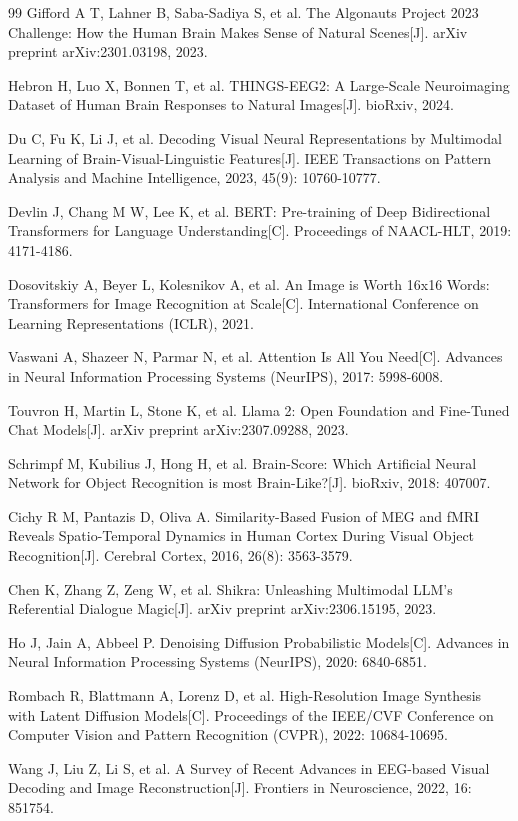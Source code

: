 \begin{thebibliography}{99}
 Gifford A T, Lahner B, Saba-Sadiya S, et al. The Algonauts Project 2023 Challenge: How the Human Brain Makes Sense of Natural Scenes[J]. arXiv preprint arXiv:2301.03198, 2023.

 Hebron H, Luo X, Bonnen T, et al. THINGS-EEG2: A Large-Scale Neuroimaging Dataset of Human Brain Responses to Natural Images[J]. bioRxiv, 2024.

 Du C, Fu K, Li J, et al. Decoding Visual Neural Representations by Multimodal Learning of Brain-Visual-Linguistic Features[J]. IEEE Transactions on Pattern Analysis and Machine Intelligence, 2023, 45(9): 10760-10777.

 Devlin J, Chang M W, Lee K, et al. BERT: Pre-training of Deep Bidirectional Transformers for Language Understanding[C]. Proceedings of NAACL-HLT, 2019: 4171-4186.

 Dosovitskiy A, Beyer L, Kolesnikov A, et al. An Image is Worth 16x16 Words: Transformers for Image Recognition at Scale[C]. International Conference on Learning Representations (ICLR), 2021.

 Vaswani A, Shazeer N, Parmar N, et al. Attention Is All You Need[C]. Advances in Neural Information Processing Systems (NeurIPS), 2017: 5998-6008.

 Touvron H, Martin L, Stone K, et al. Llama 2: Open Foundation and Fine-Tuned Chat Models[J]. arXiv preprint arXiv:2307.09288, 2023.

 Schrimpf M, Kubilius J, Hong H, et al. Brain-Score: Which Artificial Neural Network for Object Recognition is most Brain-Like?[J]. bioRxiv, 2018: 407007.

 Cichy R M, Pantazis D, Oliva A. Similarity-Based Fusion of MEG and fMRI Reveals Spatio-Temporal Dynamics in Human Cortex During Visual Object Recognition[J]. Cerebral Cortex, 2016, 26(8): 3563-3579.

 Chen K, Zhang Z, Zeng W, et al. Shikra: Unleashing Multimodal LLM's Referential Dialogue Magic[J]. arXiv preprint arXiv:2306.15195, 2023.

 Ho J, Jain A, Abbeel P. Denoising Diffusion Probabilistic Models[C]. Advances in Neural Information Processing Systems (NeurIPS), 2020: 6840-6851.

 Rombach R, Blattmann A, Lorenz D, et al. High-Resolution Image Synthesis with Latent Diffusion Models[C]. Proceedings of the IEEE/CVF Conference on Computer Vision and Pattern Recognition (CVPR), 2022: 10684-10695.

 Wang J, Liu Z, Li S, et al. A Survey of Recent Advances in EEG-based Visual Decoding and Image Reconstruction[J]. Frontiers in Neuroscience, 2022, 16: 851754.

\end{thebibliography}
